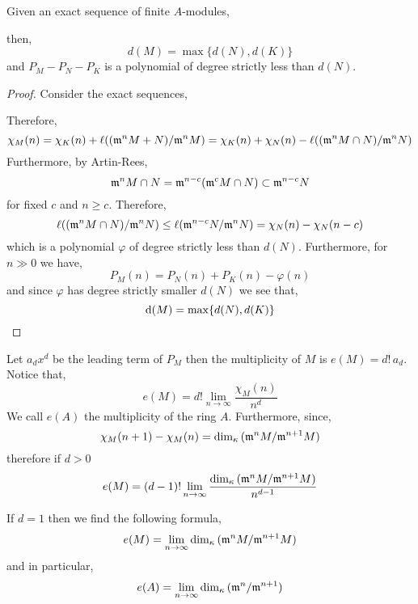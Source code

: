 \documentclass[12pt]{article}
\begin{document}
\begin{prop} \label{exactness_samuel_poly}
Given an exact sequence of finite $A$-modules,
\begin{center}
\end{center}
then,
\[ d(M) = \max \{ d(N), d(K) \} \]
and $P_{M} - P_{N} - P_{K}$ is a polynomial of degree strictly less than $d(N)$. 
\end{prop}

\begin{proof}
Consider the exact sequences,
\begin{center}
\end{center}
Therefore,
\[ \chi_M(n) = \chi_K(n) + \ell((\mathfrak{m}^n M + N) / \mathfrak{m}^n M) = \chi_K(n) + \chi_N(n) - \ell((\mathfrak{m}^n M \cap N)/\mathfrak{m}^n N) \]
Furthermore, by Artin-Rees,
\[ \mathfrak{m}^n M \cap N = \mathfrak{m}^{n-c}(\mathfrak{m}^c M \cap N) \subset \mathfrak{m}^{n-c} N \]
for fixed $c$ and $n \ge c$. Therefore,
\[ \ell((\mathfrak{m}^n M \cap N)/\mathfrak{m}^n N) \le \ell(\mathfrak{m}^{n-c} N / \mathfrak{m}^n N) = \chi_N(n) - \chi_N(n-c) \]
which is a polynomial $\varphi$ of degree strictly less than $d(N)$. Furthermore, for $n \gg 0$ we have,
\[ P_M(n) = P_N(n) + P_K(n) - \varphi(n) \]
and since $\varphi$ has degree strictly smaller $d(N)$ we see that,
\[ \mathrm{d}(M) = \max \{ d(N), d(K) \} \]
\end{proof}

\begin{defn}
Let $a_d x^d$ be the leading term of $P_M$ then the multiplicity of $M$ is $e(M) = d! \, a_d$. Notice that,
\[ e(M) = d! \lim_{n \to \infty} \frac{\chi_M(n)}{n^d} \]
We call $e(A)$ the multiplicity of the ring $A$. Furthermore, since,
\[ \chi_M(n+1) - \chi_M(n) = \dim_\kappa{(\mathfrak{m}^n M / \mathfrak{m}^{n+1} M)} \]
therefore if $d > 0$
\[ e(M) = (d-1)! \lim_{n \to \infty} \frac{\dim_\kappa{(\mathfrak{m}^n M / \mathfrak{m}^{n+1} M)}}{n^{d-1}} \]
\end{defn}

\begin{rmk}
If $d = 1$ then we find the following formula,
\[ e(M) =  \lim_{n \to \infty} \dim_\kappa{(\mathfrak{m}^n M / \mathfrak{m}^{n+1} M)} \]
and in particular,
\[ e(A) = \lim_{n \to \infty} \dim_\kappa{(\mathfrak{m}^n / \mathfrak{m}^{n+1})} \]
\end{rmk}
\end{document}

